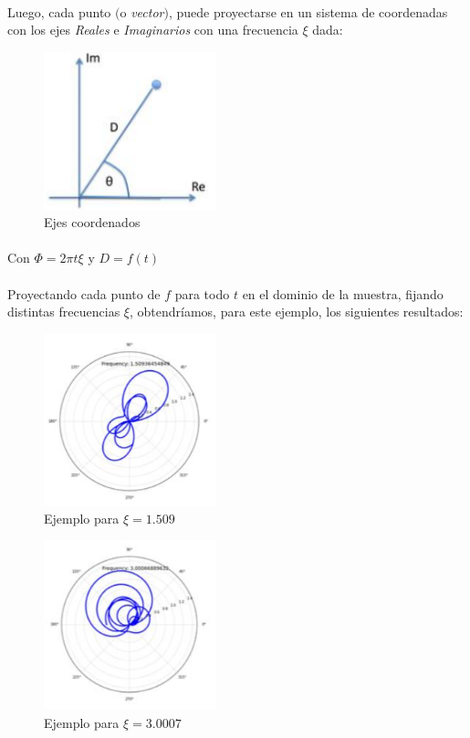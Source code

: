\documentclass[12pt, twocolumn]{article}
\begin{document}
	\paragraph{} Luego, cada punto $($o \textit{vector}$)$, puede proyectarse en un sistema de coordenadas con los ejes \textit{Reales} e \textit{Imaginarios} con una frecuencia $\xi$ dada:
	
	\begin{figure}[H]
		\centering
		\includegraphics[width=5cm]{imre.png}
		\caption{Ejes coordenados}
		\label{imre}
	\end{figure}
	
	\paragraph{} Con $\Phi=2\pi t\xi$ y $D=f(t)$

	\paragraph{} Proyectando cada punto de $f$ para todo $t$ en el dominio de la muestra, fijando distintas frecuencias $\xi$, obtendríamos, para este ejemplo, los siguientes resultados:
	
	\begin{figure}[H]
		\centering
		\includegraphics[width=5cm]{f1-5.png}
		\caption{Ejemplo para $\xi = 1.509$ }
		\label{f1-5}
	\end{figure}
	
	\begin{figure}[H]
		\centering
		\includegraphics[width=5cm]{f3-0.png}
		\caption{Ejemplo para $\xi = 3.0007$ }
		\label{f3-0}
	\end{figure}
	
\end{document}
